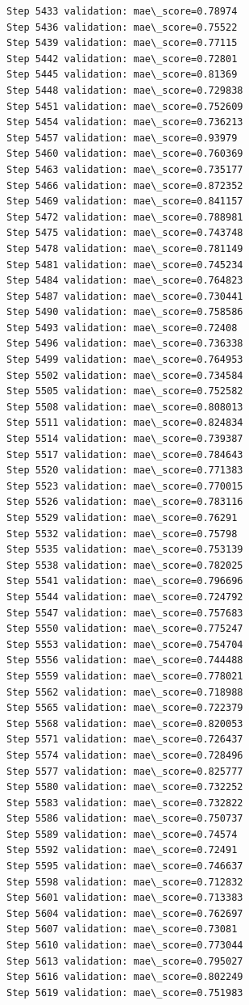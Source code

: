 \documentclass[11pt]{article}
\begin{document}
\begin{Verbatim}[commandchars=\\\{\}]
Step 5433 validation: mae\_score=0.78974
Step 5436 validation: mae\_score=0.75522
Step 5439 validation: mae\_score=0.77115
Step 5442 validation: mae\_score=0.72801
Step 5445 validation: mae\_score=0.81369
Step 5448 validation: mae\_score=0.729838
Step 5451 validation: mae\_score=0.752609
Step 5454 validation: mae\_score=0.736213
Step 5457 validation: mae\_score=0.93979
Step 5460 validation: mae\_score=0.760369
Step 5463 validation: mae\_score=0.735177
Step 5466 validation: mae\_score=0.872352
Step 5469 validation: mae\_score=0.841157
Step 5472 validation: mae\_score=0.788981
Step 5475 validation: mae\_score=0.743748
Step 5478 validation: mae\_score=0.781149
Step 5481 validation: mae\_score=0.745234
Step 5484 validation: mae\_score=0.764823
Step 5487 validation: mae\_score=0.730441
Step 5490 validation: mae\_score=0.758586
Step 5493 validation: mae\_score=0.72408
Step 5496 validation: mae\_score=0.736338
Step 5499 validation: mae\_score=0.764953
Step 5502 validation: mae\_score=0.734584
Step 5505 validation: mae\_score=0.752582
Step 5508 validation: mae\_score=0.808013
Step 5511 validation: mae\_score=0.824834
Step 5514 validation: mae\_score=0.739387
Step 5517 validation: mae\_score=0.784643
Step 5520 validation: mae\_score=0.771383
Step 5523 validation: mae\_score=0.770015
Step 5526 validation: mae\_score=0.783116
Step 5529 validation: mae\_score=0.76291
Step 5532 validation: mae\_score=0.75798
Step 5535 validation: mae\_score=0.753139
Step 5538 validation: mae\_score=0.782025
Step 5541 validation: mae\_score=0.796696
Step 5544 validation: mae\_score=0.724792
Step 5547 validation: mae\_score=0.757683
Step 5550 validation: mae\_score=0.775247
Step 5553 validation: mae\_score=0.754704
Step 5556 validation: mae\_score=0.744488
Step 5559 validation: mae\_score=0.778021
Step 5562 validation: mae\_score=0.718988
Step 5565 validation: mae\_score=0.722379
Step 5568 validation: mae\_score=0.820053
Step 5571 validation: mae\_score=0.726437
Step 5574 validation: mae\_score=0.728496
Step 5577 validation: mae\_score=0.825777
Step 5580 validation: mae\_score=0.732252
Step 5583 validation: mae\_score=0.732822
Step 5586 validation: mae\_score=0.750737
Step 5589 validation: mae\_score=0.74574
Step 5592 validation: mae\_score=0.72491
Step 5595 validation: mae\_score=0.746637
Step 5598 validation: mae\_score=0.712832
Step 5601 validation: mae\_score=0.713383
Step 5604 validation: mae\_score=0.762697
Step 5607 validation: mae\_score=0.73081
Step 5610 validation: mae\_score=0.773044
Step 5613 validation: mae\_score=0.795027
Step 5616 validation: mae\_score=0.802249
Step 5619 validation: mae\_score=0.751983

\end{Verbatim}
\end{document}
